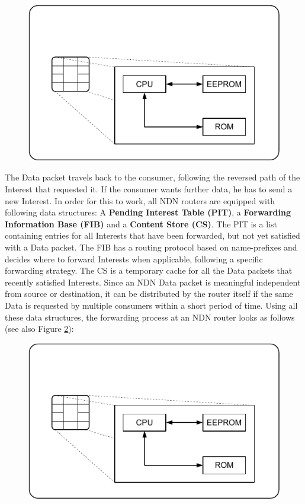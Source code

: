  \begin{figure}[ht]
 	\centering
 	\includegraphics{grundlagen/speicherkarte}
 	\label{fig:fundamentals:NDNPackagestructure}
 \end{figure}
 
 The Data packet travels back to the consumer, following the reversed path of the Interest that requested it. If the consumer wants further data, he has to send a new Interest. In order for this to work, all NDN routers are equipped with following data structures: A \textbf{Pending Interest Table (PIT)}, a \textbf{Forwarding Information Base (FIB)} and a \textbf{Content Store (CS)}. The PIT is a list containing entries for all Interests that have been forwarded, but not yet satisfied with a Data packet. The FIB has a routing protocol based on name-prefixes and decides where to forward Interests when applicable, following a specific forwarding strategy. The CS is a temporary cache for all the Data packets that recently satisfied Interests. Since an NDN Data packet is meaningful independent from source or destination, it can be distributed by the router itself if the same Data is requested by multiple consumers within a short period of time. Using all these data structures, the forwarding process at an NDN router looks as follows (see also Figure \ref{fig:fundamentals:NDNForwardingProcess}):

 \begin{figure}[ht]
 	\centering
 	\includegraphics{grundlagen/speicherkarte}
 	\label{fig:fundamentals:NDNForwardingProcess}
 \end{figure}



